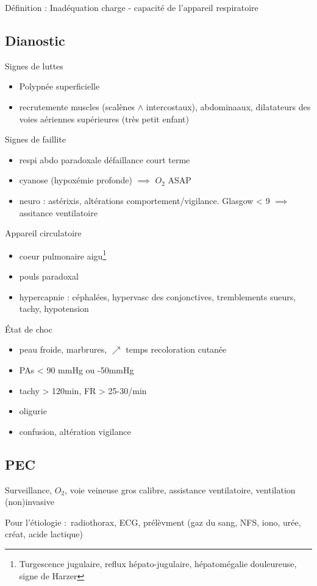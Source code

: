 \documentclass{article}
\begin{document}
Définition : Inadéquation charge - capacité de l'appareil respiratoire

\subsection{Dianostic}
Signes de luttes
\begin{itemize}
\item Polypnée superficielle
\item recrutemente muscles (scalènes $\wedge$ intercostaux), abdominaaux,
  dilatateurs des voies aériennes supérieures (très petit enfant)
\end{itemize}
Signes de faillite
\begin{itemize}
\item respi abdo paradoxale \skull défaillance court terme
\item cyanose (hypoxémie profonde) $\implies$ $O_2$ ASAP
\item neuro : astérixis, altérations comportement/vigilance. Glasgow < 9
  $\implies$ assitance ventilatoire
\end{itemize}
Appareil circulatoire
\begin{itemize}
\item coeur pulmonaire aigu\footnote{Turgescence jugulaire, reflux
    hépato-jugulaire, hépatomégalie douleureuse, signe de Harzer}
\item pouls paradoxal
\item hypercapnie : {céphalées, hypervasc des conjonctives}, {tremblements
    sueurs, tachy, hypotension}
\end{itemize}
État de choc 
\begin{itemize}
\item peau froide, marbrures, $\nearrow$ temps recoloration cutanée
\item PAs < 90 mmHg ou -50mmHg
\item tachy > 120min, FR > 25-30/min
\item oligurie
\item confusion, altération vigilance
\end{itemize}

\subsection{PEC}
Surveillance, $O_2$, voie veineuse gros calibre, assistance ventilatoire,
ventilation (non)invasive

Pour l'étiologie : radiothorax, ECG, prélèvment (gaz du sang, NFS, iono, urée,
créat, acide lactique)
\end{document}
